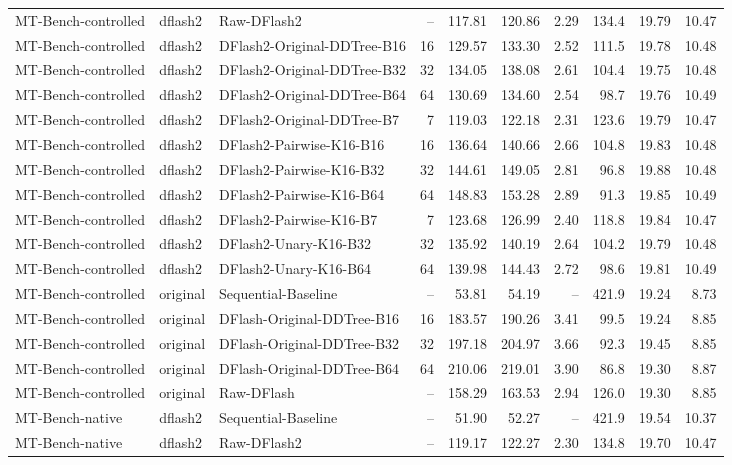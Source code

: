 \begin{longtable}{lllrrrrrrr}
MT-Bench-controlled & dflash2 & Raw-DFlash2 & -- & 117.81 & 120.86 & 2.29 & 134.4 & 19.79 & 10.47 \\
MT-Bench-controlled & dflash2 & DFlash2-Original-DDTree-B16 & 16 & 129.57 & 133.30 & 2.52 & 111.5 & 19.78 & 10.48 \\
MT-Bench-controlled & dflash2 & DFlash2-Original-DDTree-B32 & 32 & 134.05 & 138.08 & 2.61 & 104.4 & 19.75 & 10.48 \\
MT-Bench-controlled & dflash2 & DFlash2-Original-DDTree-B64 & 64 & 130.69 & 134.60 & 2.54 & 98.7 & 19.76 & 10.49 \\
MT-Bench-controlled & dflash2 & DFlash2-Original-DDTree-B7 & 7 & 119.03 & 122.18 & 2.31 & 123.6 & 19.79 & 10.47 \\
MT-Bench-controlled & dflash2 & DFlash2-Pairwise-K16-B16 & 16 & 136.64 & 140.66 & 2.66 & 104.8 & 19.83 & 10.48 \\
MT-Bench-controlled & dflash2 & DFlash2-Pairwise-K16-B32 & 32 & 144.61 & 149.05 & 2.81 & 96.8 & 19.88 & 10.48 \\
MT-Bench-controlled & dflash2 & DFlash2-Pairwise-K16-B64 & 64 & 148.83 & 153.28 & 2.89 & 91.3 & 19.85 & 10.49 \\
MT-Bench-controlled & dflash2 & DFlash2-Pairwise-K16-B7 & 7 & 123.68 & 126.99 & 2.40 & 118.8 & 19.84 & 10.47 \\
MT-Bench-controlled & dflash2 & DFlash2-Unary-K16-B32 & 32 & 135.92 & 140.19 & 2.64 & 104.2 & 19.79 & 10.48 \\
MT-Bench-controlled & dflash2 & DFlash2-Unary-K16-B64 & 64 & 139.98 & 144.43 & 2.72 & 98.6 & 19.81 & 10.49 \\
MT-Bench-controlled & original & Sequential-Baseline & -- & 53.81 & 54.19 & -- & 421.9 & 19.24 & 8.73 \\
MT-Bench-controlled & original & DFlash-Original-DDTree-B16 & 16 & 183.57 & 190.26 & 3.41 & 99.5 & 19.24 & 8.85 \\
MT-Bench-controlled & original & DFlash-Original-DDTree-B32 & 32 & 197.18 & 204.97 & 3.66 & 92.3 & 19.45 & 8.85 \\
MT-Bench-controlled & original & DFlash-Original-DDTree-B64 & 64 & 210.06 & 219.01 & 3.90 & 86.8 & 19.30 & 8.87 \\
MT-Bench-controlled & original & Raw-DFlash & -- & 158.29 & 163.53 & 2.94 & 126.0 & 19.30 & 8.85 \\
MT-Bench-native & dflash2 & Sequential-Baseline & -- & 51.90 & 52.27 & -- & 421.9 & 19.54 & 10.37 \\
MT-Bench-native & dflash2 & Raw-DFlash2 & -- & 119.17 & 122.27 & 2.30 & 134.8 & 19.70 & 10.47 \\

\end{longtable}
